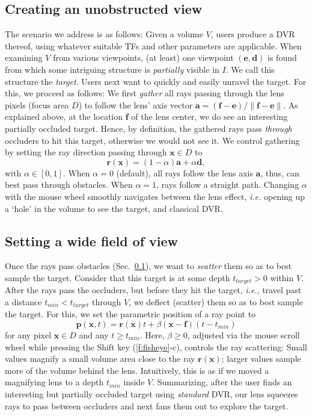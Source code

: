 \subsection{Creating an unobstructed view}
\label{sec:gathering}
%
The scenario we address is as follows: Given a volume $V$, users produce a DVR thereof, using whatever suitable TFs and other parameters are applicable. When examining $V$ from various viewpoints, (at least) one viewpoint $(\mathbf{e},\mathbf{d})$ is found from which some intriguing structure is \emph{partially} visible in $I$. We call this structure the \emph{target}. Users next want to quickly and easily unravel the target. For this, we proceed as follows: We first \emph{gather} all rays passing through the lens pixels (focus area $D$) to follow the lens' axis vector $\mathbf{a} = (\mathbf{f} - \mathbf{e}) / \| \mathbf{f} - \mathbf{e} \|$. As explained above, at the location $\mathbf{f}$ of the lens center, we do see an interesting partially occluded target. Hence, by definition, the gathered rays pass \emph{through} occluders to hit this target, otherwise we would not see it. We control gathering by setting the ray direction passing through $\mathbf{x} \in D$ to
%
\begin{equation}
\mathbf{r}(\mathbf{x}) = (1-\alpha) \mathbf{a} + \alpha \mathbf{d},
\label{eqn:gathering}
\end{equation}
%
with $\alpha \in [0,1]$. When $\alpha=0$ (default), all rays follow the lens axis $\mathbf{a}$, thus, can best pass through obstacles. When $\alpha=1$, rays follow a straight path. Changing $\alpha$ with the mouse wheel smoothly navigates between the lens effect, \emph{i.e.} opening up a `hole' in the volume to see the target, and classical DVR.
%
\subsection{Setting a wide field of view}
\label{sec:scattering}
%
Once the rays pass obstacles (Sec.~\ref{sec:gathering}), we want to \emph{scatter} them so as to best sample the target. Consider that this target is at some depth $t_{target}>0$ within $V$. After the rays pass the occluders, but before they hit the target, \emph{i.e.}, travel past a distance $t_{min} < t_{target}$ through $V$, we deflect (scatter) them so as to best sample the target. For this, we set the parametric position of a ray point to
%
\begin{equation}
\mathbf{p}(\mathbf{x}, t) = \mathbf{r}(\mathbf{x})t + \beta (\mathbf{x}-\mathbf{f})(t-t_{min})
\label{eqn:scattering}
\end{equation}
%
for any pixel $\mathbf{x} \in D$ and any $t \geq t_{min}$. Here, $\beta \geq 0$, adjusted via the mouse scroll wheel while pressing the Shift key (\autoref{f:fisheye}-c), controls the ray scattering: Small values magnify a small volume area close to the ray $\mathbf{r}(\mathbf{x})$; larger values sample more of the volume behind the lens. Intuitively, this is as if we moved a magnifying lens to a depth $t_{min}$ inside $V$. Summarizing, after the user finds an interesting but partially occluded target using \emph{standard} DVR, our lens squeezes rays to pass between occluders and next fans them out to explore the target.
%
%

